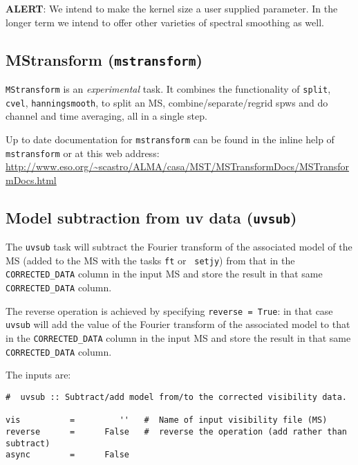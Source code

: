 {\bf ALERT}: We intend to make the kernel size a user supplied
parameter.  In the longer term we intend to offer other varieties of
spectral smoothing as well.


\subsection{MStransform ({\tt mstransform})}
\label{section:cal.other.mstransform}

{\tt MStransform} is an {\it experimental} task. It combines the
functionality of {\tt split}, {\tt cvel}, {\tt hanningsmooth}, to
split an MS, combine/separate/regrid spws and do channel and time
averaging, all in a single step. 


Up to date documentation for {\tt mstransform} can be found in the
inline help of {\tt mstransform} or
at this web address:\\

\url{http://www.eso.org/~scastro/ALMA/casa/MST/MSTransformDocs/MSTransformDocs.html}


\subsection{Model subtraction from uv data ({\tt uvsub})}
\label{section:cal.other.uvsub}

The {\tt uvsub} task will subtract the Fourier transform of the
associated model of the MS (added to the MS with the tasks {\tt ft} or {\tt
  setjy}) from that in the {\tt
  CORRECTED\_DATA} column in the input MS and store the result in that
same {\tt CORRECTED\_DATA} column. 

The reverse operation is achieved by specifying {\tt reverse = True}:
in that case {\tt uvsub} will add the value of the Fourier transform of
the associated model to that in the {\tt CORRECTED\_DATA} column in
the input MS and store the result in that same {\tt CORRECTED\_DATA}
column.

The inputs are:

\small
\begin{verbatim}
#  uvsub :: Subtract/add model from/to the corrected visibility data.

vis          =         ''   #  Name of input visibility file (MS)
reverse      =      False   #  reverse the operation (add rather than subtract)
async        =      False   
\end{verbatim}
\normalsize

